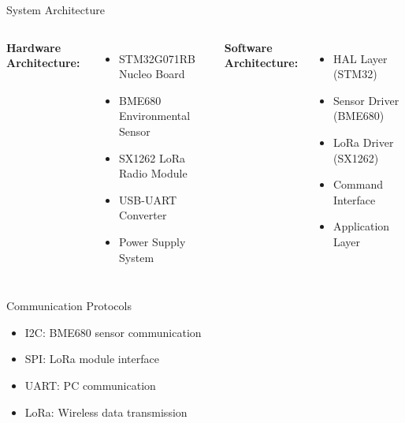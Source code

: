 \documentclass[aspectratio=169]{beamer}
\begin{document}
\begin{frame}{System Architecture}
\begin{columns}
\textbf{Hardware Architecture:}
\begin{itemize}
    \item STM32G071RB Nucleo Board
    \item BME680 Environmental Sensor
    \item SX1262 LoRa Radio Module
    \item USB-UART Converter
    \item Power Supply System
\end{itemize}

\textbf{Software Architecture:}
\begin{itemize}
    \item HAL Layer (STM32)
    \item Sensor Driver (BME680)
    \item LoRa Driver (SX1262)
    \item Command Interface
    \item Application Layer
\end{itemize}
\end{columns}

\begin{block}{Communication Protocols}
\begin{itemize}
    \item I2C: BME680 sensor communication
    \item SPI: LoRa module interface
    \item UART: PC communication
    \item LoRa: Wireless data transmission
\end{itemize}
\end{block}
\end{frame}
\end{document}
